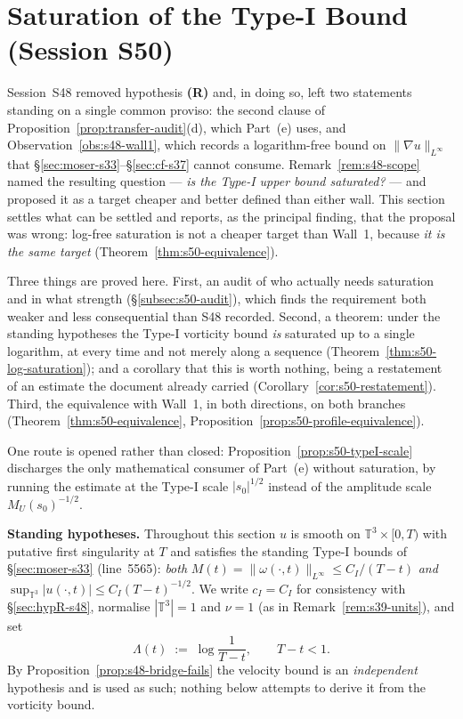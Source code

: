 \documentclass[11pt]{article}
\theoremstyle{definition}
\theoremstyle{remark}
\newcommand{\T}{\mathbb{T}}
\begin{document}
\section{Saturation of the Type-I Bound (Session S50)}
\label{sec:saturation-s50}

Session~S48 removed hypothesis \textbf{(R)} and, in doing so, left two
statements standing on a single common proviso: the second clause of
Proposition~\ref{prop:transfer-audit}(d), which Part~(e) uses, and
Observation~\ref{obs:s48-wall1}, which records a logarithm-free bound on
$\|\nabla u\|_{L^\infty}$ that §\ref{sec:moser-s33}--§\ref{sec:cf-s37} cannot
consume. Remark~\ref{rem:s48-scope} named the resulting question --- \emph{is
the Type-I upper bound saturated?} --- and proposed it as a target cheaper and
better defined than either wall. This section settles what can be settled and
reports, as the principal finding, that the proposal was wrong: log-free
saturation is not a cheaper target than Wall~1, because
\emph{it is the same target} (Theorem~\ref{thm:s50-equivalence}).

Three things are proved here. First, an audit of who actually needs saturation
and in what strength (§\ref{subsec:s50-audit}), which finds the requirement
both weaker and less consequential than S48 recorded. Second, a theorem: under
the standing hypotheses the Type-I vorticity bound \emph{is} saturated up to a
single logarithm, at every time and not merely along a sequence
(Theorem~\ref{thm:s50-log-saturation}); and a corollary that this is worth
nothing, being a restatement of an estimate the document already carried
(Corollary~\ref{cor:s50-restatement}). Third, the equivalence with Wall~1, in
both directions, on both branches (Theorem~\ref{thm:s50-equivalence},
Proposition~\ref{prop:s50-profile-equivalence}).

One route is opened rather than closed: Proposition~\ref{prop:s50-typeI-scale}
discharges the only mathematical consumer of Part~(e) without saturation, by
running the estimate at the Type-I scale $|s_0|^{1/2}$ instead of the amplitude
scale $M_U(s_0)^{-1/2}$.

\medskip
\noindent\textbf{Standing hypotheses.} Throughout this section $u$ is smooth
on $\T^3\times[0,T)$ with putative first singularity at $T$ and satisfies the
standing Type-I bounds of §\ref{sec:moser-s33} (line~5565): \emph{both}
$M(t)=\|\omega(\cdot,t)\|_{L^\infty}\leq C_I/(T-t)$ \emph{and}
$\sup_{\T^3}|u(\cdot,t)|\leq C_I(T-t)^{-1/2}$. We write $c_I=C_I$ for
consistency with §\ref{sec:hypR-s48}, normalise $|\T^3|=1$ and $\nu=1$ (as in
Remark~\ref{rem:s39-units}), and set
\[
  \Lambda(t) \;:=\; \log\frac{1}{T-t}, \qquad T-t<1 .
\]
By Proposition~\ref{prop:s48-bridge-fails} the velocity bound is an
\emph{independent} hypothesis and is used as such; nothing below attempts to
derive it from the vorticity bound.
\end{document}
